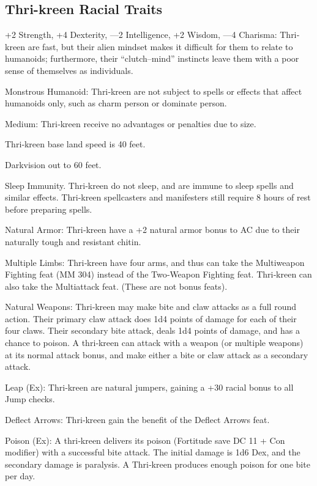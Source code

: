 \subsection{Thri-kreen Racial Traits}
\begin{itemize*}
    \item +2 Strength, +4 Dexterity, —2 Intelligence, +2 Wisdom, —4 Charisma: Thri‐kreen are fast, but their alien mindset makes it difficult for them to relate to humanoids; furthermore, their “clutch–mind” instincts leave them with a poor sense of themselves as individuals.
    \item Monstrous Humanoid: Thri‐kreen are not subject to spells or effects that affect humanoids only, such as charm person or dominate person.
    \item Medium: Thri‐kreen receive no advantages or penalties due to size.
    \item Thri‐kreen base land speed is 40 feet.
    \item Darkvision out to 60 feet.
    \item Sleep Immunity. Thri‐kreen do not sleep, and are immune to sleep spells and similar effects. Thri‐kreen spellcasters and manifesters still require 8 hours of rest before preparing spells.
    \item Natural Armor: Thri‐kreen have a +2 natural armor bonus to AC due to their naturally tough and resistant chitin.
    \item Multiple Limbs: Thri‐kreen have four arms, and thus can take the Multiweapon Fighting feat (MM 304) instead of the Two‐Weapon Fighting feat. Thri‐kreen can also take the Multiattack feat. (These are not bonus feats).
    \item Natural Weapons: Thri‐kreen may make bite and claw attacks as a full round action. Their primary claw attack does 1d4 points of damage for each of their four claws. Their secondary bite attack, deals 1d4 points of damage, and has a chance to poison. A thri‐kreen can attack with a weapon (or multiple weapons) at its normal attack bonus, and make either a bite or claw attack as a secondary attack.
    \item Leap (Ex): Thri‐kreen are natural jumpers, gaining a +30 racial bonus to all Jump checks.
    \item Deflect Arrows: Thri‐kreen gain the benefit of the Deflect Arrows feat.
    \item Poison (Ex): A thri‐kreen delivers its poison (Fortitude save DC 11 + Con modifier) with a successful bite attack. The initial damage is 1d6 Dex, and the secondary damage is paralysis. A Thri‐kreen produces enough poison for one bite per day.

\end{itemize*}
